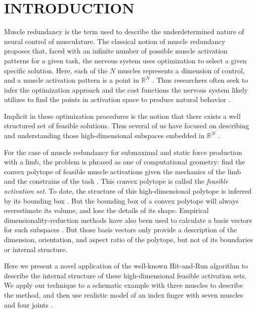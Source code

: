 
\section{INTRODUCTION}

Muscle redundancy is the term used to describe the underdetermined nature of neural control of musculature.
The classical notion of muscle redundancy  proposes that, faced with an infinite number of possible muscle activation patterns for a given task, the nervous system uses optimization to select a given specific solution.
Here, each of the $N$ muscles represents a dimension of control, and a muscle activation pattern is a point in $\mathbb{R}^N$ \cite{Valero-Cuevas1998Large}.
Thus researchers often seek to infer the optimization approach and the cost functions the nervous system likely utilizes to find the points in activation space to produce natural behavior \cite{Chao1978Graphical,Prilutsky2000Muscle,scott2004optimal,todorov2002optimal,crowninshield1981physiologically,higginson2005simulated}. 


Implicit in these optimization procedures is the notion that there exists a well structured set of feasible solutions. Thus several of us have focused on describing and understanding those high-dimensional subspaces  embedded in $\mathbb{R}^N$ \cite{kutch2011muscle,kutch2012challenges,sohn2013cat_bounding_box,Valero-Cuevas1998Large,Valero-Cuevas2015high-dimensional}.

For the case of muscle redundancy for submaximal and static force production with a limb,  the problem is phrased as one of computational geometry: find the convex polytope of feasible muscle activations given the mechanics of the limb and the constrains of the task \cite{avis1992Pivoting,Valero-Cuevas1998Large,Valero-Cuevas2009mathematical,Valero-Cuevas2015high-dimensional}.  This convex polytope is called the \emph{feasible activation set}. To date, the structure of this high-dimensional polytope is inferred by its bounding box  \cite{kutch2011muscle,sohn2013cat_bounding_box,Valero-Cuevas2015high-dimensional}.  But the bounding box of a convex polytope will always overestimate its volume, and lose the details of its shape.  Empirical dimensionality-reduction methods have also been used to calculate a basis vectors for such subspaces \cite{Clewley2008Estimating,davella2005shared,krishnamoorthy2003muscle}. But those basis  vectors only provide a description of the dimension, orientation, and aspect ratio of the polytope, but not of its boundaries or internal  structure.

Here we present a novel application of the well-known Hit-and-Run algorithm \cite{smith1984efficient} to describe the internal structure of these high-dimensional feasible activation sets. We apply our technique to a schematic example with three muscles to describe the method, and then use realistic model of an index finger with seven muscles and four joints \cite{Valero-Cuevas1998Large}.